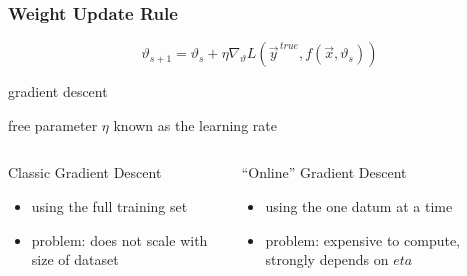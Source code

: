 \documentclass[
  aspectratio=1610, %
  intlimits %
]{beamer}
\begin{document}
 \begin{frame}
 \frametitle{Weight Update Rule}

 \begin{equation*}
\vartheta_{s+1} = \vartheta_{s} + \eta \nabla_{\vartheta}L( \vec{y}^{\,true}, f(\vec{x}, \vartheta_{s}))
\end{equation*}

\begin{exampleblock}{gradient descent}
  \begin{center}
    free parameter $\eta$ known as the learning rate
  \end{center}
\end{exampleblock}

\begin{columns}
  \begin{column}{.45\textwidth}
    \begin{alertblock}{Classic Gradient Descent}
    \begin{itemize}
    \item using the full training set
    \item problem: does not scale with size of dataset
    \end{itemize}
  \end{alertblock}
\end{column}

\begin{column}{.45\textwidth}
  
  \begin{alertblock}{``Online'' Gradient Descent}
    \begin{itemize}
    \item using the one datum at a time
    \item problem: expensive to compute, strongly depends on $eta$
    \end{itemize}
  \end{alertblock}
    
  \end{column}
\end{columns}

\end{frame}
\end{document}
